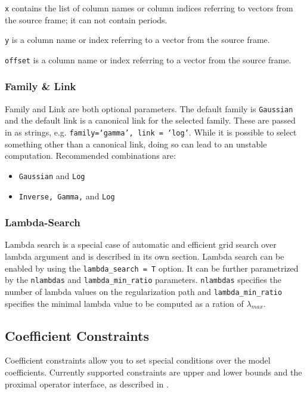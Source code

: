 \documentclass{article}[11pt]
\begin{document}
\texttt{x} contains the list of column names or column indices referring to vectors from the source frame; it can not contain periods.

\texttt{y} is a column name or index referring to a vector from the source frame.

\texttt{offset} is a column name or index referring to a vector from the source frame.
  
\subsubsection{Family \& Link}
Family and Link are both optional parameters. The default family is \texttt{Gaussian} and the default link is a canonical link for the selected family. These are passed in as strings, e.g. \texttt{family=`gamma', link = `log'}.
While it is possible to select something other than a canonical link, doing so can lead to an unstable computation. Recommended combinations are: 
\begin{itemize}
\item \texttt{Gaussian} and \texttt{Log}
\item \texttt{Inverse, Gamma,} and \texttt{Log}
\end{itemize} 

\subsubsection{Lambda-Search}
Lambda search is a special case of automatic and efficient grid search over lambda argument and is described in its own section. Lambda search can be enabled by using the \texttt{lambda\_search = T} option. It can be further parametrized by the \texttt{nlambdas} and \texttt{lambda\_min\_ratio} parameters. 
\texttt{nlambdas} specifies the number of lambda values on the regularization path and \texttt{lambda\_min\_ratio} specifies the minimal lambda value to be computed as a ration of $\lambda_{max}$.

\subsection{Coefficient Constraints}
Coefficient constraints allow you to set special conditions over the model coefficients. Currently supported constraints are upper and lower bounds and the proximal operator interface, as described in .
\end{document}
